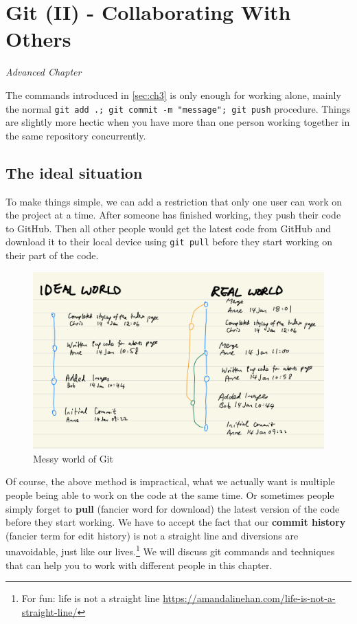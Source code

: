 \chapter{Git (II) - Collaborating With Others}
\label{sec:git2}

\textit{Advanced Chapter}
\vspace{6mm}

The commands introduced in \cref{sec:ch3} is only enough for working alone, mainly the normal \texttt{git add .; git commit -m "message"; git push} procedure. Things are slightly more hectic when you have more than one person working together in the same repository concurrently. 

\section{The ideal situation}

To make things simple, we can add a restriction that only one user can work on the project at a time. After someone has finished working, they push their code to GitHub. Then all other people would get the latest code from GitHub and download it to their local device using \texttt{git pull} before they start working on their part of the code. 

\begin{figure}[h]
\centering
\includegraphics[width=15cm]{images/ch8-messy-git-world.png}
\caption{Messy world of Git}
\end{figure}

Of course, the above method is impractical, what we actually want is multiple people being able to work on the code at the same time. Or sometimes people simply forget to \textbf{pull} (fancier word for download) the latest version of the code before they start working. We have to accept the fact that our \textbf{commit history} (fancier term for edit history) is not a straight line and diversions are unavoidable, just like our lives.\footnote{For fun: life is not a straight line \url{https://amandalinehan.com/life-is-not-a-straight-line/}} We will discuss git commands and techniques that can help you to work with different people in this chapter.

